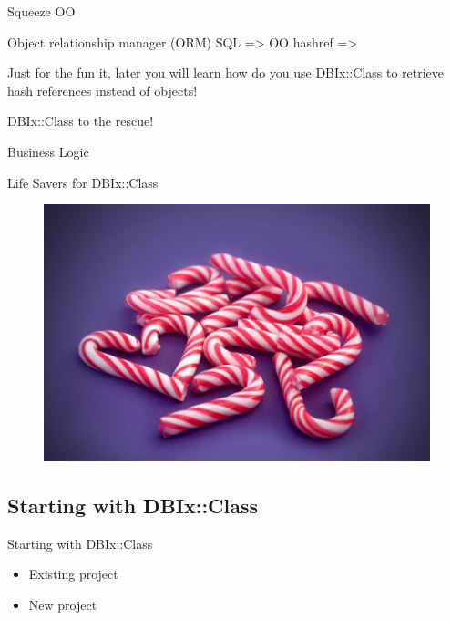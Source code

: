 \begin{frame}{Squeeze OO}

Object relationship manager (ORM)
SQL => OO
hashref => 

\end{frame}

Just for the fun it, later you will learn how do you
use DBIx::Class to retrieve hash references instead of
objects!

\begin{frame}{DBIx::Class to the rescue!}
\end{frame}

\begin{frame}{Business Logic}
\end{frame}

\begin{frame}{Life Savers for DBIx::Class}
\begin{figure}[!ht]
\centering
\includegraphics[width=0.8\linewidth]{img/candy-cane.jpg}
\end{figure}
\end{frame}

\subsection{Starting with DBIx::Class}

\begin{frame}{Starting with DBIx::Class}
\begin{itemize}
\item Existing project
\item New project
\end{itemize}
\end{frame}

